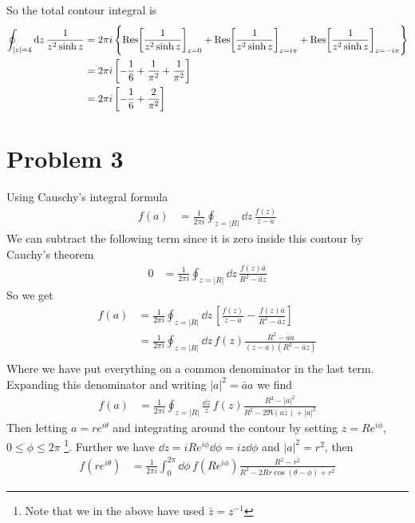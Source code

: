 \documentclass[a4paper,12pt]{article}
\begin{document}
So the total contour integral is
\begin{equation}
	\begin{aligned}
		\oint_{|z|=4}\dd z\,\frac{1}{z^2\sinh z}  &=2\pi i \left\{
		\Res[\frac{1}{z^2\sinh z}]_{z=0}+\Res[\frac{1}{z^2\sinh z}]_{z=i\pi}+\Res[\frac{1}{z^2\sinh z}]_{z=-i\pi}
		\right\}\\
		&=2\pi i \left[-\frac{1}{6}+\frac{1}{\pi^2}+\frac{1}{\pi^2}\right]\\
		&=2\pi i \left[-\frac{1}{6}+\frac{2}{\pi^2}\right]
	\end{aligned}
\end{equation}
\section*{Problem 3}
Using Causchy's integral formula
\begin{equation}
	\begin{aligned}
f(a)&=\frac{1}{2\pi i}\oint_{z=|R|} \dd z\,\frac{f(z)}{z-a}
	\end{aligned}
\end{equation}
We can subtract the following term since it is zero inside this contour by Cauchy's theorem
\begin{equation}
	\begin{aligned}
		0&=\frac{1}{2\pi i}\oint_{z=|R|} \dd z\,\frac{f(z)\bar a}{ R^2-\bar az}
	\end{aligned}
\end{equation}
So we get
\begin{equation}
	\begin{aligned}
		f(a)&=\frac{1}{2\pi i}\oint_{z=|R|} \dd z\,\left[\frac{f(z)}{z-a}-\frac{f(z)\bar a}{ R^2-\bar az}\right]\\
		&=\frac{1}{2\pi i}\oint_{z=|R|} \dd z\,f(z)\frac{R^2-\bar a a}{(z-a)(R^2-\bar az)}\\
	\end{aligned}
\end{equation}
Where we have put everything on a common denominator in the last term. Expanding this denominator and writing $|a|^2=\bar a a$ we find
\begin{equation}
	\begin{aligned}
		f(a)
		&=\frac{1}{2\pi i}\oint_{z=|R|} \frac{\dd z}{z}\,f(z)\frac{R^2-|a|^2}{R^2-2\Re(a\bar z)+|a|^2}
	\end{aligned}
\end{equation}
Then letting $a=re^{i\theta}$ and integrating around the contour by setting $z=Re^{i\phi}$, $0\leq \phi \leq 2\pi$ \footnote{Note that we in the above have used $\bar z=z^{-1}$}. Further we have $\dd z=iRe^{i\phi}\dd \phi=iz\dd \phi$ and $|a|^2=r^2$, then
\begin{equation}
	\begin{aligned}
f(re^{i\theta})&=\frac{1}{2\pi i}\int_{0}^{2\pi} \dd \phi\,f(Re^{i\phi})\frac{R^2-r^2}{R^2-2Rr\cos(\theta-\phi)+r^2}
	\end{aligned}
\end{equation}
\end{document}
